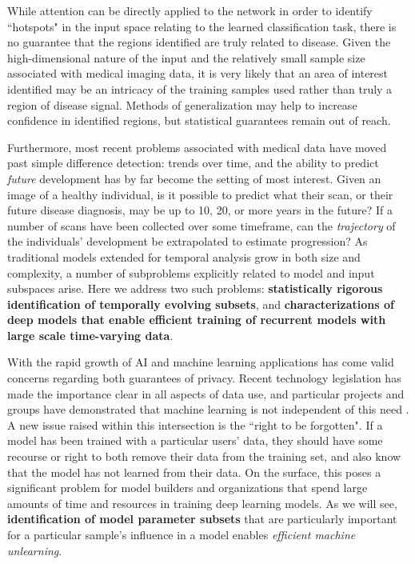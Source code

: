 While attention can be directly applied to the network in order to identify ``hotspots" in the input space relating to the learned classification task, there is no guarantee that the regions identified are truly related to disease.
Given the high-dimensional nature of the input and the relatively small sample size associated with medical imaging data, it is very likely that an area of interest identified may be an intricacy of the training samples used rather than truly a region of disease signal.
Methods of generalization may help to increase confidence in identified regions, but statistical guarantees remain out of reach.

Furthermore, most recent problems associated with medical data have moved past simple difference detection: trends over time, and the ability to predict {\em future} development has by far become the setting of most interest.
Given an image of a healthy individual, is it possible to predict what their scan, or their future disease diagnosis, may be up to 10, 20, or more years in the future?
If a number of scans have been collected over some timeframe, can the \textit{trajectory} of the individuals' development be extrapolated to estimate progression?
As traditional models extended for temporal analysis grow in both size and complexity,
a number of subproblems explicitly related to model and input subspaces arise. Here we address two such problems: \textbf{statistically rigorous identification of temporally evolving subsets}, and \textbf{characterizations of deep models that enable efficient training of recurrent models with large scale time-varying data}.

With the rapid growth of AI and machine learning applications has come valid concerns regarding both guarantees of privacy.
Recent technology legislation has made the importance clear in all aspects of data use,
and particular projects and groups have demonstrated that machine learning is not independent of
this need \citep{Exposing}.
A new issue raised within this intersection is the ``right to be forgotten".
If a model has been trained with a particular users' data, 
they should have some recourse or right
to both remove their data from the training set,
and also know that the model has not learned from their data.
On the surface, this poses a significant problem for model builders
and organizations that spend large amounts
of time and resources in 
training deep learning models.
As we will see, 
\textbf{identification of model parameter subsets}
that are particularly important
for a particular sample's influence
in a model enables \textit{efficient machine unlearning}.

